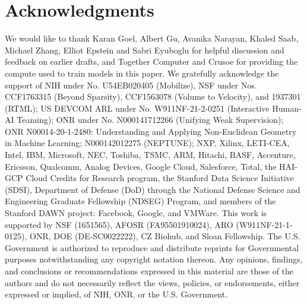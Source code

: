 \section*{Acknowledgments}

We would like to thank Karan Goel, Albert Gu, Avanika Narayan, Khaled Saab, Michael Zhang, Elliot Epstein and Sabri Eyuboglu for helpful discussion and feedback on earlier drafts, and Together Computer and Crusoe for providing the compute used to train models in this paper. We gratefully acknowledge the support of NIH under No. U54EB020405 (Mobilize), NSF under Nos. CCF1763315 (Beyond Sparsity), CCF1563078 (Volume to Velocity), and 1937301 (RTML); US DEVCOM ARL under No. W911NF-21-2-0251 (Interactive Human-AI Teaming); ONR under No. N000141712266 (Unifying Weak Supervision); ONR N00014-20-1-2480: Understanding and Applying Non-Euclidean Geometry in Machine Learning; N000142012275 (NEPTUNE); NXP, Xilinx, LETI-CEA, Intel, IBM, Microsoft, NEC, Toshiba, TSMC, ARM, Hitachi, BASF, Accenture, Ericsson, Qualcomm, Analog Devices, Google Cloud, Salesforce, Total, the HAI-GCP Cloud Credits for Research program,  the Stanford Data Science Initiative (SDSI), Department of Defense (DoD) through the National Defense Science and Engineering Graduate Fellowship (NDSEG) Program, and members of the Stanford DAWN project: Facebook, Google, and VMWare. This work is supported by NSF (1651565), AFOSR (FA95501910024), ARO (W911NF-21-1-0125), ONR, DOE (DE-SC0022222), CZ Biohub, and Sloan Fellowship. The U.S. Government is authorized to reproduce and distribute reprints for Governmental purposes notwithstanding any copyright notation thereon. Any opinions, findings, and conclusions or recommendations expressed in this material are those of the authors and do not necessarily reflect the views, policies, or endorsements, either expressed or implied, of NIH, ONR, or the U.S. Government. 